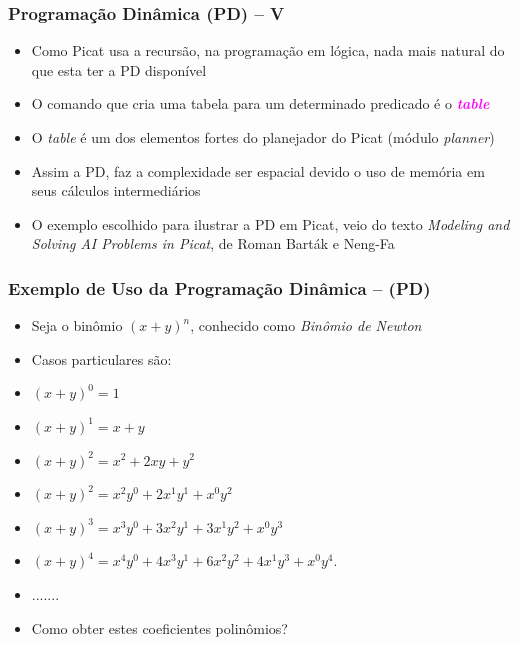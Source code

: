 \begin{frame}[fragile]

    \frametitle{Programação Dinâmica (PD) -- V}

   \begin{block}{}
     \begin{itemize}

      \item Como Picat usa a recursão, na programação em lógica, nada mais
      natural do que esta ter a PD disponível 

       \pause
       \item O comando que cria uma tabela para um determinado predicado é o  \textcolor{magenta}{\textbf{\textit{table}}}
 
        \pause
       \item O \textit{table}  é um dos elementos fortes do planejador do Picat (módulo \textit{planner})

        \pause
       \item Assim a PD, faz a complexidade ser espacial devido o uso de memória em seus cálculos intermediários

        \pause
       \item O exemplo escolhido para ilustrar a PD em Picat, veio do texto \textit{Modeling and Solving AI
        Problems in Picat}, de Roman Barták e Neng-Fa
    \end{itemize}
    
    \end{block}
    
\end{frame}



\begin{frame}[fragile]

\frametitle{Exemplo de Uso da Programação Dinâmica -- (PD)}

\begin{itemize}
  \item Seja o binômio ${\left(x + y\right)}^n$, conhecido como \textit{Binômio de Newton}

  \pause 
  \item Casos particulares são:
  \item  ${\left(x + y\right)}^0 = 1$
  \item  ${\left(x + y\right)}^1 = x + y$
  \item  ${\left(x + y\right)}^2 = x^2 + 2xy + y^2$
  
  \pause
  \item  ${\left(x + y\right)}^2 = x^2y^0 + 2x^1y^1 + x^0y^2$
  \item  ${\left(x + y\right)}^3 = x^3y^0 + 3x^2y^1 + 3x^1y^2 + x^0y^3$
  \item  ${\left(x + y\right)}^4 = x^4y^0 + 4x^3y^1 + 6x^2y^2 + 4x^1y^3 + x^0y^4.$
  \item  .......
  \pause
 \item Como obter estes coeficientes  polinômios?  

\end{itemize}
    
\end{frame}


